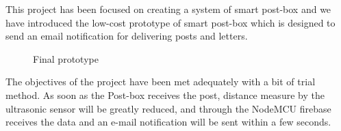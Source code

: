 \label{chapter: Results}
This project has been focused on creating a system of smart post-box and we have introduced the low-cost prototype of smart post-box which is designed to send an email notification for delivering posts and letters. 
\begin{figure}[htp]
    \centering
    \qquad
    \caption{Final prototype}
    \label{fig:prototype}
\end{figure}

The objectives of the project have been met adequately with a bit of trial method. As soon as the Post-box receives the post, distance measure by the ultrasonic sensor will be greatly reduced, and through the NodeMCU firebase receives the data and an e-mail notification will be sent within a few seconds.  
